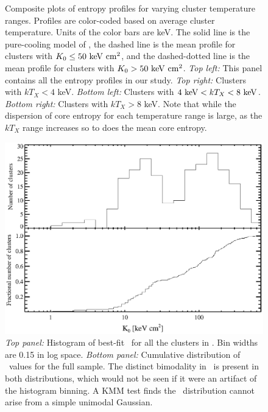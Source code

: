 \begin{center}
\begin{figure}[htp]
\begin{minipage}[htp]{0.5\linewidth}
    \end{minipage}
    \caption{Composite plots of entropy profiles for varying cluster
      temperature ranges. Profiles are color-coded based on average
      cluster temperature. Units of the color bars are keV. The solid
      line is the pure-cooling model of \cite{voitbryan}, the dashed
      line is the mean profile for clusters with $K_0 \le 50 \mathrm{\mbox{\ensuremath{\mathrm{~keV}}} \mathrm{\mbox{\ensuremath{\mathrm{~cm}}}^2}}$,
      and the dashed-dotted line is the mean profile for clusters with
      $K_0 > 50 \mathrm{\mbox{\ensuremath{\mathrm{~keV}}} \mathrm{\mbox{\ensuremath{\mathrm{~cm}}}^2}}$. {\it{Top left:}} This panel contains all the
      entropy profiles in our study. {\it{Top right:}} Clusters with
      $kT_X < 4$ keV. {\it{Bottom left:}} Clusters with $4\mbox{\ensuremath{\mathrm{~keV}}} < kT_X
      < 8\mbox{\ensuremath{\mathrm{~keV}}}$. {\it{Bottom right:}} Clusters with $kT_X > 8$
      keV. Note that while the dispersion of core entropy for each
      temperature range is large, as the $kT_X$ range increases so to
      does the mean core entropy.}
    \label{fig:splots}
  \end{figure}
\end{center}
\clearpage
\begin{figure}[htp]
  \begin{center}
    \begin{minipage}[htp]{0.9\linewidth}
      \includegraphics*[width=\textwidth, trim=20mm 10mm 10mm 10mm, clip]{k0hist.eps}
      \caption{{\it{Top panel:}} Histogram of best-fit \kna\ for all
        the clusters in \accept. Bin widths are 0.15 in log space.
        {\it{Bottom panel:}} Cumulative distribution of \kna\ values
        for the full sample. The distinct bimodality in \kna\ is
        present in both distributions, which would not be seen if it
        were an artifact of the histogram binning. A KMM test finds
        the \kna\ distribution cannot arise from a simple unimodal
        Gaussian.}
      \label{fig:k0hist}
    \end{minipage}
  \end{center}
\end{figure}
